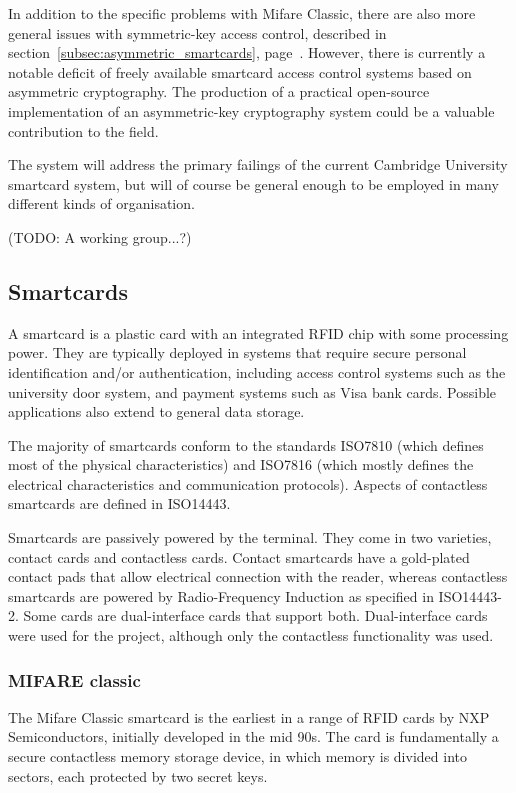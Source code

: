\documentclass[12pt]{article}
\begin{document}
In addition to the specific problems with Mifare Classic, there are also more general issues with symmetric-key access control, described in section~\ref{subsec:asymmetric_smartcards}, page~\pageref{subsec:asymmetric_smartcards}. However, there is currently a notable deficit of freely available smartcard access control systems based on asymmetric cryptography. The production of a practical open-source implementation of an asymmetric-key cryptography system could be a valuable contribution to the field.

The system will address the primary failings of the current Cambridge University smartcard system, but will of course be general enough to be employed in many different kinds of organisation.


(TODO: A working group...?)




 
\subsection{Smartcards}
A smartcard is a plastic card with an integrated RFID chip with some processing power. They are typically deployed in systems that require secure personal identification and/or authentication, including access control systems such as the university door system, and payment systems such as Visa bank cards. Possible applications also extend to general data storage.

The majority of smartcards conform to the standards ISO7810 (which defines most of the physical characteristics) and ISO7816 (which mostly defines the electrical characteristics and communication protocols). Aspects of contactless smartcards are defined in ISO14443.

Smartcards are passively powered by the terminal. They come in two varieties, contact cards and contactless cards. Contact smartcards have a gold-plated contact pads that allow electrical connection with the reader, whereas contactless smartcards are powered by Radio-Frequency Induction as specified in ISO14443-2. Some cards are dual-interface cards that support both. Dual-interface cards were used for the project, although only the contactless functionality was used.

\subsubsection{MIFARE classic}
The Mifare Classic smartcard is the earliest in a range of RFID cards by NXP Semiconductors, initially developed in the mid 90s. The card is fundamentally a secure contactless memory storage device, in which memory is divided into sectors, each protected by two secret keys.
\end{document}
